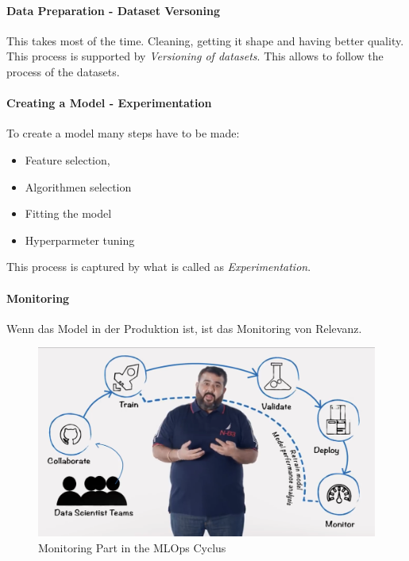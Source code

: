 \paragraph{Data Preparation - Dataset Versoning}
This takes most of the time. Cleaning, getting it shape and having better quality. This process is supported by \textit{Versioning of datasets}. This allows to follow the process of the datasets.

\paragraph{Creating a Model - Experimentation}
To create a model many steps have to be made:
\begin{itemize}
	\item Feature selection,
	\item Algorithmen selection
	\item Fitting the model
	\item Hyperparmeter tuning
\end{itemize}

This process is captured by what is called as \textit{Experimentation}.

\paragraph{Monitoring}
Wenn das Model in der Produktion ist, ist das Monitoring von Relevanz. 

\begin{figure}[H]
	\centering
	\includegraphics[scale = 0.1]{attachment/chapter_10/Scc025}
	\caption{Monitoring Part in the MLOps Cyclus}
\end{figure}

